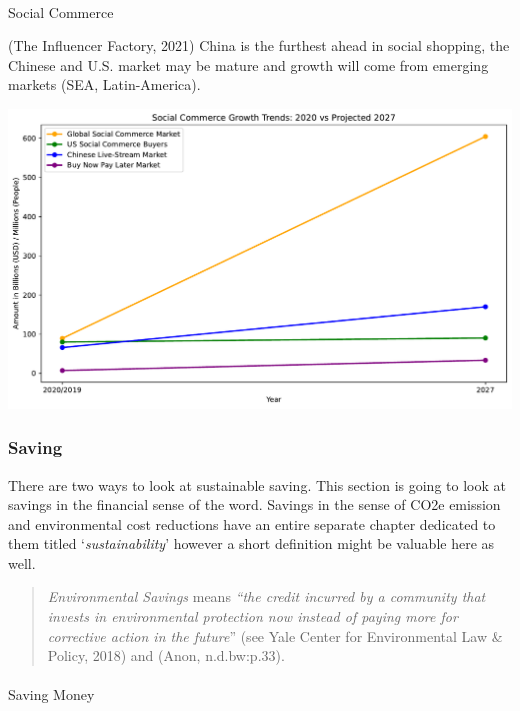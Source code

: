 \documentclass[
  letterpaper,
  DIV=11,
  numbers=noendperiod]{scrartcl}
\makeatletter
\let\oldparagraph\paragraph
\renewcommand{\paragraph}{
    \@ifstar
      \xxxParagraphStar
      \xxxParagraphNoStar
  }
\newcommand{\xxxParagraphStar}[1]{\oldparagraph*{#1}\mbox{}}
\newcommand{\xxxParagraphNoStar}[1]{\oldparagraph{#1}\mbox{}}
\makeatother
\begin{document}
\paragraph{Social Commerce}\label{social-commerce}

(The Influencer Factory, 2021) China is the furthest ahead in social
shopping, the Chinese and U.S. market may be mature and growth will come
from emerging markets (SEA, Latin-America).

\includegraphics{_thesis_files/figure-pdf/cell-33-output-1.pdf}

\subsubsection{Saving}\label{saving}

There are two ways to look at sustainable saving. This section is going
to look at savings in the financial sense of the word. Savings in the
sense of CO2e emission and environmental cost reductions have an entire
separate chapter dedicated to them titled `\emph{sustainability}'
however a short definition might be valuable here as well.

\begin{quote}
\emph{Environmental Savings} means \emph{``the credit incurred by a
community that invests in environmental protection now instead of paying
more for corrective action in the future}'' (see Yale Center for
Environmental Law \& Policy, 2018) and (Anon, n.d.bw:p.33).
\end{quote}

\paragraph{Saving Money}\label{saving-money}
\end{document}
